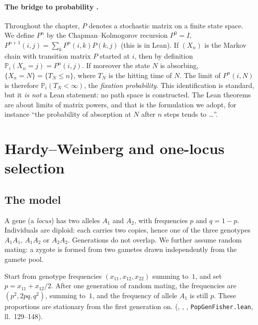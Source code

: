 \paragraph{The bridge to probability \tierC.} Throughout the chapter, $P$ denotes a stochastic matrix
on a finite state space. We define $P^n$ by the Chapman--Kolmogorov recursion $P^0=I$,
$P^{n+1}(i,j)=\sum_kP^n(i,k)P(k,j)$ (this is  in Lean). If $(X_n)$ is the Markov chain with transition
matrix $P$ started at $i$, then by definition $\mathbb P_i(X_n=j)=P^n(i,j)$. If moreover the state $N$ is absorbing,
$\{X_n=N\}=\{T_N\le n\}$, where $T_N$ is the hitting time of $N$. The limit of $P^n(i,N)$ is therefore
$\mathbb P_i(T_N<\infty)$, the \emph{fixation probability}. This identification is standard, but it
\emph{is not} a Lean statement: no path space is constructed. The Lean theorems are about
limits of matrix powers, and that is the formulation we adopt, for instance ``the probability
of absorption at $N$ after $n$ steps tends to \dots''.

\section{Hardy--Weinberg and one-locus selection}\label{ch4:sec:hw}

\subsection{The model}
A gene (a \emph{locus}) has two alleles $A_1$ and $A_2$, with frequencies $p$ and $q=1-p$. Individuals are
diploid: each carries two copies, hence one of the three genotypes $A_1A_1$, $A_1A_2$ or $A_2A_2$.
Generations do not overlap. We further assume random mating: a zygote is formed from two
gametes drawn independently from the gamete pool.

\begin{proposition}\label{ch4:prop:hw}
Start from genotype frequencies $(x_{11},x_{12},x_{22})$ summing to~$1$, and set $p=x_{11}+x_{12}/2$. After one
generation of random mating, the frequencies are $(p^2,2pq,q^2)$, summing to~$1$, and the frequency of
allele $A_1$ is still $p$. These proportions are stationary from the first generation on.
\tierA{} (, , , \texttt{PopGenFisher.lean},
ll.~129--148).
\end{proposition}

